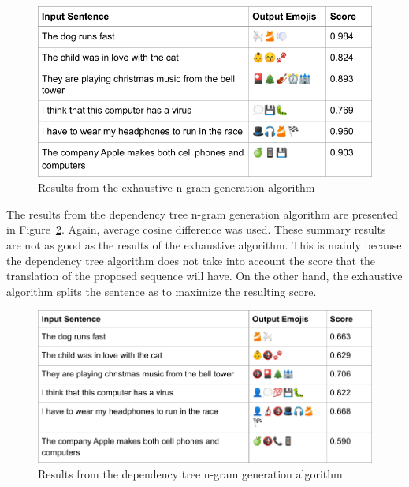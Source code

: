 \documentclass{article}[10]
\begin{document}
\begin{figure}[H]
  \begin{center}
    \includegraphics[width=\columnwidth]{figures/extractive.png}
    \caption{Results from the exhaustive n-gram generation algorithm\label{fig:extractive}}
  \end{center}
\end{figure}

The results from the dependency tree n-gram generation algorithm are presented in Figure~\ref{fig:dependency}. Again, average cosine difference was
used.  These summary results are not as good as the results of the exhaustive algorithm. This is mainly because the dependency tree algorithm does not take into account the score that the translation of the proposed sequence will have. On the other hand, the exhaustive algorithm splits the sentence as to maximize the resulting score.

\begin{figure}[H]
  \begin{center}
    \includegraphics[width=\columnwidth]{figures/dependency.png}
      \caption{Results from the dependency tree n-gram generation algorithm\label{fig:dependency}}
  \end{center}
\end{figure}
\end{document}
